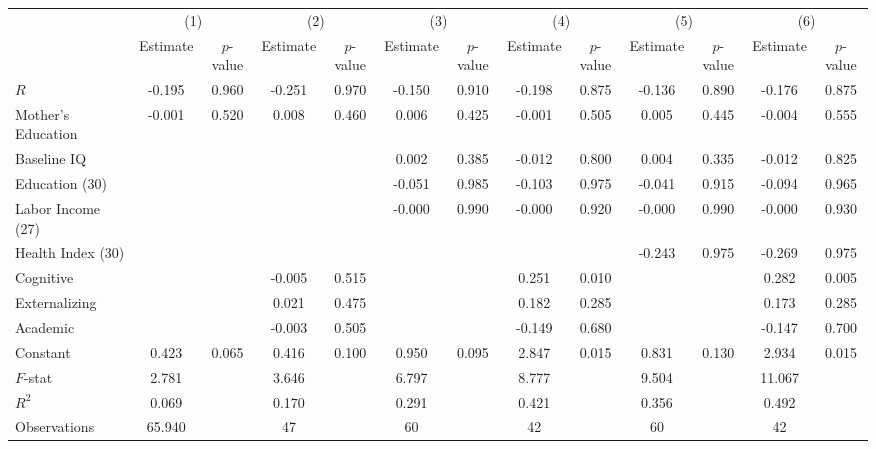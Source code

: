 
\begin{tabular}{lcccccccccccc} \toprule
 & \multicolumn{2}{c}{(1)}  &  \multicolumn{2}{c}{(2)}  &  \multicolumn{2}{c}{(3)}  &  \multicolumn{2}{c}{(4)}  & \multicolumn{2}{c}{(5)} & \multicolumn{2}{c}{(6)} \\  
 & Estimate & $p$-value & Estimate & $p$-value & Estimate & $p$-value & Estimate & $p$-value & Estimate & $p$-value & Estimate & $p$-value \\ \midrule
$R$ &    -0.195 &     0.960 &    -0.251 &     0.970 &    -0.150 &     0.910 &    -0.198 &     0.875 &    -0.136 &     0.890 &    -0.176 &     0.875 \\  
Mother's Education &    -0.001 &     0.520 &     0.008 &     0.460 &     0.006 &     0.425 &    -0.001 &     0.505 &     0.005 &     0.445 &    -0.004 &     0.555 \\  
Baseline IQ &         &         &         &         &     0.002 &     0.385 &    -0.012 &     0.800 &     0.004 &     0.335 &    -0.012 &     0.825 \\  
Education (30) &         &         &         &         &    -0.051 &     0.985 &    -0.103 &     0.975 &    -0.041 &     0.915 &    -0.094 &     0.965 \\  
Labor Income (27) &         &         &         &         &    -0.000 &     0.990 &    -0.000 &     0.920 &    -0.000 &     0.990 &    -0.000 &     0.930 \\  
Health Index (30) &         &         &         &         &         &         &         &         &    -0.243 &     0.975 &    -0.269 &     0.975 \\  
Cognitive &         &         &    -0.005 &     0.515 &         &         &     0.251 &     0.010 &         &         &     0.282 &     0.005 \\  
Externalizing &         &         &     0.021 &     0.475 &         &         &     0.182 &     0.285 &         &         &     0.173 &     0.285 \\  
Academic &         &         &    -0.003 &     0.505 &         &         &    -0.149 &     0.680 &         &         &    -0.147 &     0.700 \\  
Constant &     0.423 &     0.065 &     0.416 &     0.100 &     0.950 &     0.095 &     2.847 &     0.015 &     0.831 &     0.130 &     2.934 &     0.015 \\  \midrule
$F$-stat &     2.781 &         &     3.646 &         &     6.797 &         &     8.777 &         &     9.504 &         &    11.067 &         \\  
$R^2$ &     0.069 &         &     0.170 &         &     0.291 &         &     0.421 &         &     0.356 &         &     0.492 &         \\  
Observations &    65.940 &         &    47 &         &    60  &         &    42 &         &    60 &         &    42 &         \\  
\bottomrule \end{tabular}

